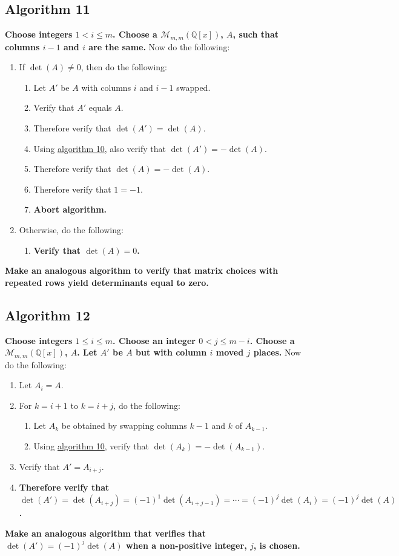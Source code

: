 \documentclass[twocolumn]{article}
\begin{document}
		\subsection{Algorithm 11}\label{sec:algorithm 11}
			\textbf{Choose integers $1<i\le m$. Choose a $\mathcal{M}_{m,m}(\mathbb{Q}[x])$, $A$, such that columns $i-1$ and $i$ are the same.} Now do the following:
			\begin{enumerate}
				\item If $\det(A)\ne 0$, then do the following:
				\begin{enumerate}
					\item Let $A'$ be $A$ with columns $i$ and $i-1$ swapped.
					\item Verify that $A'$ equals $A$.
					\item Therefore verify that $\det(A')=\det(A)$.
					\item Using \hyperref[sec:algorithm 10]{algorithm 10}, also verify that $\det(A')=-\det(A)$.
					\item Therefore verify that $\det(A)=-\det(A)$.
					\item Therefore verify that $1=-1$.
					\item \textbf{Abort algorithm.}
				\end{enumerate}
				\item Otherwise, do the following:
				\begin{enumerate}
					\item \textbf{Verify that $\det(A)=0$.}
				\end{enumerate}
			\end{enumerate}
			\textbf{Make an analogous algorithm to verify that matrix choices with repeated rows yield determinants equal to zero.}
		\subsection{Algorithm 12}\label{sec:algorithm 12}
			\textbf{Choose integers $1\le i\le m$. Choose an integer $0<j\le m-i$. Choose a $\mathcal{M}_{m,m}(\mathbb{Q}[x])$, $A$. Let $A'$ be $A$ but with column $i$ moved $j$ places.} Now do the following:
			\begin{enumerate}
				\item Let $A_i=A$.
				\item For $k=i+1$ to $k=i+j$, do the following:
				\begin{enumerate}
					\item Let $A_k$ be obtained by swapping columns $k-1$ and $k$ of $A_{k-1}$.
					\item Using \hyperref[sec:algorithm 10]{algorithm 10}, verify that $\det(A_k)=-\det(A_{k-1})$.
				\end{enumerate}
				\item Verify that $A'=A_{i+j}$.
				\item \textbf{Therefore verify that $\det(A')=\det(A_{i+j})=(-1)^1\det(A_{i+j-1})=\cdots=(-1)^j\det(A_{i})=(-1)^j\det(A)$.}
			\end{enumerate}
			\textbf{Make an analogous algorithm that verifies that $\det(A')=(-1)^j\det(A)$ when a non-positive integer, $j$, is chosen.}
			
\end{document}
